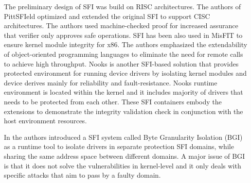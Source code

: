 The preliminary design of SFI was build on RISC
architectures. The authors of PittSFIeld \cite{PittSFIeld} optimized and
extended the original SFI to support CISC architectures.
The authors used machine-checked proof for increased assurance that
verifier only approves safe operations.
%
SFI has been also used in MisFIT \cite{MISFit} to ensure kernel
module integrity for x86. The authors emphasized the
extendability of object-oriented programming languages to eliminate
the need for remote calls to achieve high throughput. 
%
Nooks \cite{Nooks:03} is another SFI-based solution that provides
protected environment for running device drivers by isolating kernel
modules and device derives mainly for reliability and
fault-resistance. Nooks runtime environment is located within the
kernel and it includes majority of drivers that needs to be protected
from each other. 
These SFI containers embody the extensions to demonstrate the integrity
validation check in conjunction with the host environment resources.

In \cite{Castro-BGI} the authors introduced a SFI system called Byte
Granularity Isolation (BGI) as a runtime tool to isolate drivers in
separate protection SFI domains, while sharing the same address space
between different domains. 
A major issue of BGI is that it
does not solve the vulnerabilities in kernel-level and it only deals
with specific attacks that aim to pass by a faulty domain.

